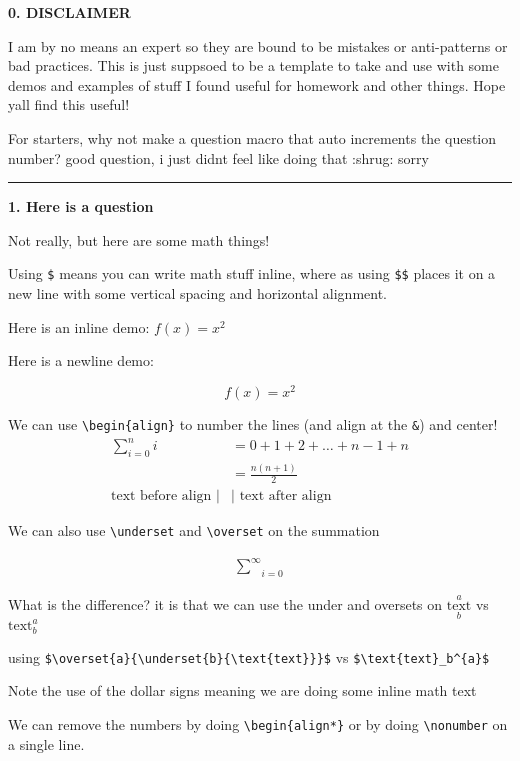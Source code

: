 \documentclass{article}
\begin{document}
\noindent \textbf{0. DISCLAIMER}

I am by no means an expert so they are bound to be mistakes or anti-patterns or bad practices. This is just suppsoed to be a template to take and use with some demos and examples of stuff I found useful for homework and other things. Hope yall find this useful!

For starters, why not make a question macro that auto increments the question number? good question, i just didnt feel like doing that :shrug: sorry

\noindent\rule{\textwidth}{0.5pt}

\noindent \textbf{1. Here is a question }

Not really, but here are some math things!

Using \verb+$+ means you can write math stuff inline, where as using \verb+$$+ places it on a new line with some vertical spacing and horizontal alignment.

Here is an inline demo: $f(x)=x^{2}$

Here is a newline demo:

$$ f(x) = x^{2} $$

We can use \verb+\begin{align}+ to number the lines (and align at the \verb+&+) and center!
\begin{align}
    \sum_{i=0}^{n} {i} &= 0 + 1 + 2 + \hdots + n-1 + n \\
    &= \frac{n(n+1)}{2} \\
    \text{text before align $|$}&\text{$|$ text after align}
\end{align}

We can also use \verb+\underset+ and \verb+\overset+ on the summation

\begin{align}
    \underset{i=0}{\overset{\infty}{\sum}} 
\end{align}

What is the difference? it is that we can use the under and oversets on $\overset{a}{\underset{b}{\text{text}}}$ 
vs
$\text{text}_b^{a}$ 

using \verb+$\overset{a}{\underset{b}{\text{text}}}$+ vs \verb+$\text{text}_b^{a}$ +

Note the use of the dollar signs meaning we are doing some inline math text

We can remove the numbers by doing \verb+\begin{align*}+ or by doing \verb+\nonumber+ on a single line.
\end{document}
